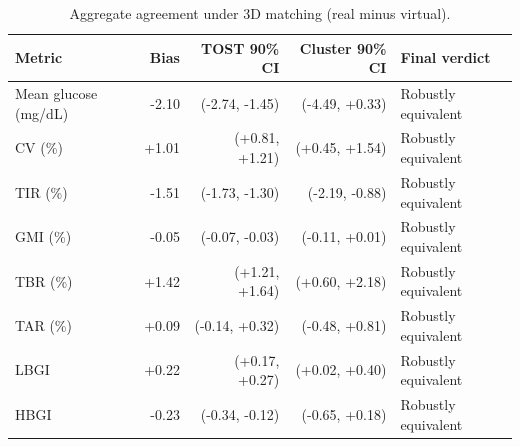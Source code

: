 \begin{table}[!t]
\centering
\caption{Aggregate agreement under 3D matching (real minus virtual).}
\label{tab:aggregate}
\begin{tabular}{lrrrl}
\toprule
Metric & Bias & TOST 90\% CI & Cluster 90\% CI & Final verdict \\
\midrule
Mean glucose (mg/dL) & -2.10 & (-2.74, -1.45) & (-4.49, +0.33) & Robustly equivalent \\
CV (\%) & +1.01 & (+0.81, +1.21) & (+0.45, +1.54) & Robustly equivalent \\
TIR (\%) & -1.51 & (-1.73, -1.30) & (-2.19, -0.88) & Robustly equivalent \\
GMI (\%) & -0.05 & (-0.07, -0.03) & (-0.11, +0.01) & Robustly equivalent \\
TBR (\%) & +1.42 & (+1.21, +1.64) & (+0.60, +2.18) & Robustly equivalent \\
TAR (\%) & +0.09 & (-0.14, +0.32) & (-0.48, +0.81) & Robustly equivalent \\
LBGI & +0.22 & (+0.17, +0.27) & (+0.02, +0.40) & Robustly equivalent \\
HBGI & -0.23 & (-0.34, -0.12) & (-0.65, +0.18) & Robustly equivalent \\
\bottomrule
\end{tabular}
\end{table}
